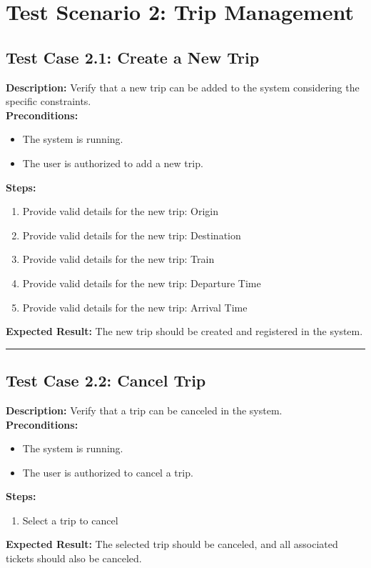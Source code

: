 \documentclass{article}
\begin{document}
\pagebreak

\section{Test Scenario 2: Trip Management}
\bigskip
\bigskip
\subsection{Test Case 2.1: Create a New Trip}

\textbf{Description:} Verify that a new trip can be added to the system considering the specific constraints.\\
\textbf{Preconditions:}
\begin{itemize}
  \item The system is running.
  \item The user is authorized to add a new trip.
\end{itemize}
\textbf{Steps:}
\begin{enumerate}
  \item Provide valid details for the new trip: Origin
  \item Provide valid details for the new trip: Destination
  \item Provide valid details for the new trip: Train
  \item Provide valid details for the new trip: Departure Time
  \item Provide valid details for the new trip: Arrival Time
\end{enumerate}
\textbf{Expected Result:} The new trip should be created and registered in the system.

\bigskip
\hrule
\bigskip

\subsection{Test Case 2.2: Cancel Trip}

\textbf{Description:} Verify that a trip can be canceled in the system.\\
\textbf{Preconditions:}
\begin{itemize}
  \item The system is running.
  \item The user is authorized to cancel a trip.
\end{itemize}
\textbf{Steps:}
\begin{enumerate}
  \item Select a trip to cancel
\end{enumerate}
\textbf{Expected Result:} The selected trip should be canceled, and all associated tickets should also be canceled.
\end{document}
